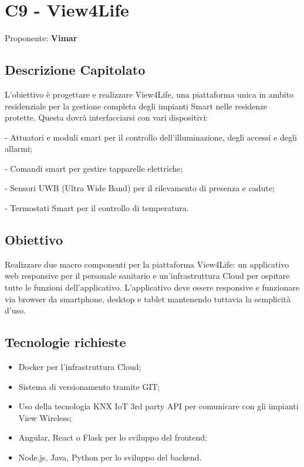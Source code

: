 \documentclass[a4paper,12pt]{article}
\begin{document}
\section{C9 - View4Life}{
    Proponente: \textbf{Vimar}
    \subsection*{Descrizione Capitolato}{
        L'obiettivo è progettare e realizzare View4Life, una piattaforma unica in ambito residenziale per la gestione completa degli impianti Smart nelle residenze protette. Questa dovrà interfacciarsi con vari dispositivi:
        
        - Attuatori e moduli smart per il controllo dell'illuminazione, degli accessi e degli allarmi;
        
        - Comandi smart per gestire tapparelle elettriche;
        
        - Sensori UWB (Ultra Wide Band) per il rilevamento di presenza e cadute;
        
        - Termostati Smart per il controllo di temperatura.
    }

    \subsection*{Obiettivo}{
        Realizzare due macro componenti per la piattaforma View4Life: un applicativo web responsive per il personale sanitario e un'infrastruttura Cloud per ospitare tutte le funzioni dell'applicativo. L'applicativo deve essere responsive e funzionare via browser da smartphone, desktop e tablet mantenendo tuttavia la semplicità d'uso.
    }

    \subsection*{Tecnologie richieste}{
        \begin{itemize}
            \item Docker per l'infrastruttura Cloud;
            \item Sistema di versionamento tramite GIT;
            \item Uso della tecnologia KNX IoT 3rd party API per comunicare con gli impianti View Wireless;
            \item Angular, React o Flask per lo sviluppo del frontend;
            \item Node.js, Java, Python per lo sviluppo del backend.
        \end{itemize}
    }

}
\end{document}
